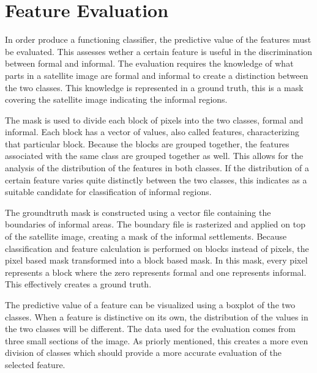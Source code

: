 
\section{Feature Evaluation}

In order produce a functioning classifier, the predictive value of the features
must be evaluated. This assesses wether a certain feature is useful in the
discrimination between formal and informal. The evaluation requires the
knowledge of what parts in a satellite image are formal and informal to create
a distinction between the two classes. This knowledge is represented in
a ground truth, this is a mask covering the satellite image indicating the
informal regions.

The mask is used to divide each block of pixels into the two classes, formal
and informal. Each block has a vector of values, also called features,
characterizing that particular block. Because the blocks are grouped together,
the features associated with the same class are grouped together as well. This
allows for the analysis of the distribution of the features in both classes. If
the distribution of a certain feature varies quite distinctly between the two
classes, this indicates as a suitable candidate for classification of informal
regions.

The groundtruth mask is constructed using a vector file containing the
boundaries of informal areas. The boundary file is rasterized and applied on
top of the satellite image, creating a mask of the informal settlements.
Because classification and feature calculation is performed on blocks instead
of pixels, the pixel based mask transformed into a block based mask. In this
mask, every pixel represents a block where the zero represents formal and one
represents informal. This effectively creates a ground truth.  

The predictive value of a feature can be visualized using a boxplot of the two
classes. When a feature is distinctive on its own, the distribution of the
values in the two classes will be different. The data used for the evaluation
comes from three small sections of the image. As priorly mentioned, this
creates a more even division of classes which should provide a more accurate
evaluation of the selected feature.

